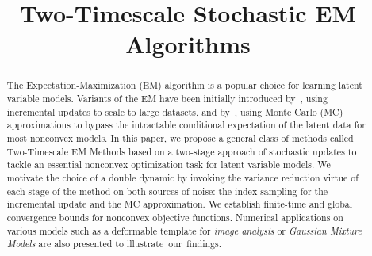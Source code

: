 \documentclass[conference,letterpaper]{IEEEtran}
\begin{document}
\title{Two-Timescale Stochastic EM Algorithms} 



\author{%
}


\maketitle

\begin{abstract}
The Expectation-Maximization (EM) algorithm is a popular choice for learning latent variable models. 
Variants of the EM have been initially introduced by~\cite{neal1998view}, using incremental updates to scale to large datasets, and by~\cite{wei1990monte, delyon1999}, using Monte Carlo (MC) approximations to bypass the intractable conditional expectation of the latent data for most nonconvex models.
In this paper, we propose a general class of methods called Two-Timescale EM Methods based on a two-stage approach of stochastic updates to tackle an essential nonconvex optimization task for latent variable models.
We motivate the choice of a double dynamic by invoking the variance reduction virtue of each stage of the method on both sources of noise: the index sampling for the incremental update and the MC approximation.
We establish finite-time and global convergence bounds for nonconvex objective functions.
Numerical applications on various models such as a deformable template for \emph{image analysis} or \emph{Gaussian Mixture Models} are also presented to illustrate~our~findings.
\end{abstract}
\end{document}
